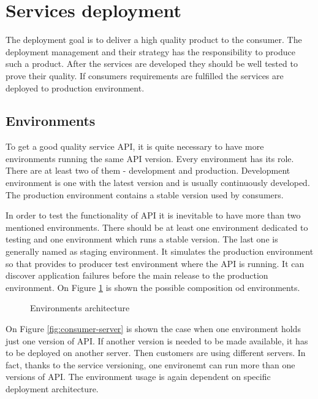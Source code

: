 \section{Services deployment}
The deployment goal is to deliver a high quality product to the consumer. The deployment management and their strategy has the responsibility to produce such a product. After the services are developed they should be well tested to prove their quality. If consumers requirements are fulfilled the services are deployed to production environment.

\subsection{Environments}
To get a good quality service API, it is quite necessary to have more environments running the same API version. Every environment has its role. There are at least two of them - development and production. Development environment is one with the latest version and is usually continuously developed. The production environment contains a stable version used by consumers.

In order to test the functionality of API it is inevitable to have more than two mentioned environments. There should be at least one environment dedicated to testing and one environment which runs a stable version. The last one is generally named as staging environment. It simulates the production environment so that provides to producer test environment where the API is running. It can discover application failures before the main release to the production environment. On Figure \ref{fig:environments} is shown the possible composition od environments.

\begin{figure}[htp] 
\caption{Environments architecture}
\label{fig:environments}
\end{figure} 


On Figure \ref{fig:consumer-server} is shown the case when one environment holds just one version of API. If another version is needed to be made available, it has to be deployed on another server. Then customers are using different servers. In fact, thanks to the service versioning, one environemt can run more than one versions of API. The environment usage is again dependent on specific deployment architecture.

